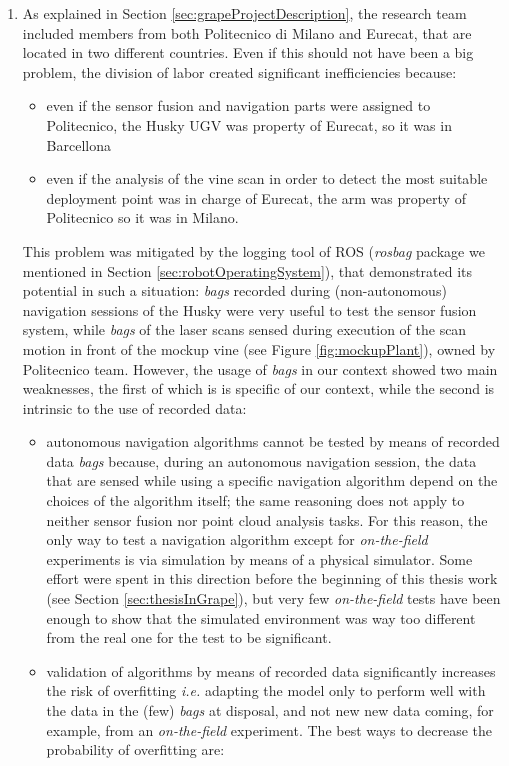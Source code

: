 \begin{enumerate}
	\item As explained in Section \ref{sec:grapeProjectDescription}, the research team included members from both Politecnico di Milano and Eurecat, that are located in two different countries. Even if this should not have been a big problem, the division of labor created significant inefficiencies because:
	\begin{itemize}
		\item even if the sensor fusion and navigation parts were assigned to Politecnico, the Husky \ac{UGV} was property of Eurecat, so it was in Barcellona
		\item even if the analysis of the vine scan in order to detect the most suitable deployment point was in charge of Eurecat, the arm was property of Politecnico so it was in Milano.
	\end{itemize}
	This problem was mitigated by the logging tool of \ac{ROS} (\textit{rosbag} package we mentioned in Section \ref{sec:robotOperatingSystem}), that demonstrated its potential in such a situation: \textit{bags} recorded during (non-autonomous) navigation sessions of the Husky were very useful to test the sensor fusion system, while \textit{bags} of the laser scans sensed during execution of the scan motion in front of the mockup vine (see Figure \ref{fig:mockupPlant}), owned by Politecnico team. However, the usage of \textit{bags} in our context showed two main weaknesses, the first of which is is specific of our context, while the second is intrinsic to the use of recorded data:
\begin{itemize}
	\item autonomous navigation algorithms cannot be tested by means of recorded data \textit{bags} because, during an autonomous navigation session, the data that are sensed while using a specific navigation algorithm depend on the choices of the algorithm itself; the same reasoning does not apply to neither sensor fusion nor point cloud analysis tasks.
	For this reason, the only way to test a navigation algorithm except for \textit{on-the-field} experiments is via simulation by means of a physical simulator. Some effort were spent in this direction before the beginning of this thesis work (see Section \ref{sec:thesisInGrape}), but very few \textit{on-the-field} tests have been enough to show that the simulated environment was way too different from the real one for the test to be significant.
	\item validation of algorithms by means of recorded data significantly increases the risk of overfitting \textit{i.e.} adapting the model only to perform well with the data in the (few) \textit{bags} at disposal, and not new new data coming, for example, from an \textit{on-the-field} experiment. The best ways to decrease the probability of overfitting are:

\end{itemize}
\end{enumerate}
